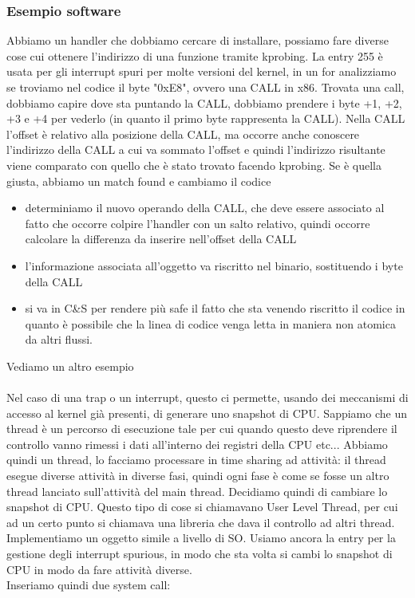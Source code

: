 \documentclass[12pt, oneside]{extbook}
\begin{document}
\subsubsection*{Esempio software}
Abbiamo un handler che dobbiamo cercare di installare, possiamo fare diverse cose cui ottenere l'indirizzo di una funzione tramite kprobing. La entry 255 è usata per gli interrupt spuri per molte versioni del kernel, in un for analizziamo se troviamo nel codice il byte "0xE8", ovvero una CALL in x86. Trovata una call, dobbiamo capire dove sta puntando la CALL, dobbiamo prendere i byte +1, +2, +3 e +4 per vederlo (in quanto il primo byte rappresenta la CALL). Nella CALL l'offset è relativo alla posizione della CALL, ma occorre anche conoscere l'indirizzo della CALL a cui va sommato l'offset e quindi l'indirizzo risultante viene comparato con quello che è stato trovato facendo kprobing. Se è quella giusta, abbiamo un match found e cambiamo il codice
\begin{itemize}
\item determiniamo il nuovo operando della CALL, che deve essere associato al fatto che occorre colpire l'handler con un salto relativo, quindi occorre calcolare la differenza da inserire nell'offset della CALL
\item l'informazione associata all'oggetto va riscritto nel binario, sostituendo i byte della CALL
\item si va in C\&S per rendere più safe il fatto che sta venendo riscritto il codice in quanto è possibile che la linea di codice venga letta in maniera non atomica da altri flussi.
\end{itemize}
Vediamo un altro esempio\\\\Nel caso di una trap o un interrupt, questo ci permette, usando dei meccanismi di accesso al kernel già presenti, di generare uno snapshot di CPU. Sappiamo che un thread è un percorso di esecuzione tale per cui quando questo deve riprendere il controllo vanno rimessi i dati all'interno dei registri della CPU etc... Abbiamo quindi un thread, lo facciamo processare in time sharing ad attività: il thread esegue diverse attività in diverse fasi, quindi ogni fase è come se fosse un altro thread lanciato sull'attività del main thread. Decidiamo quindi di cambiare lo snapshot di CPU. Questo tipo di cose si chiamavano User Level Thread, per cui ad un certo punto si chiamava una libreria che dava il controllo ad altri thread. Implementiamo un oggetto simile a livello di SO. Usiamo ancora la entry per la gestione degli interrupt spurious, in modo che sta volta si cambi lo snapshot di CPU in modo da fare attività diverse.\\Inseriamo quindi due system call:
\end{document}
